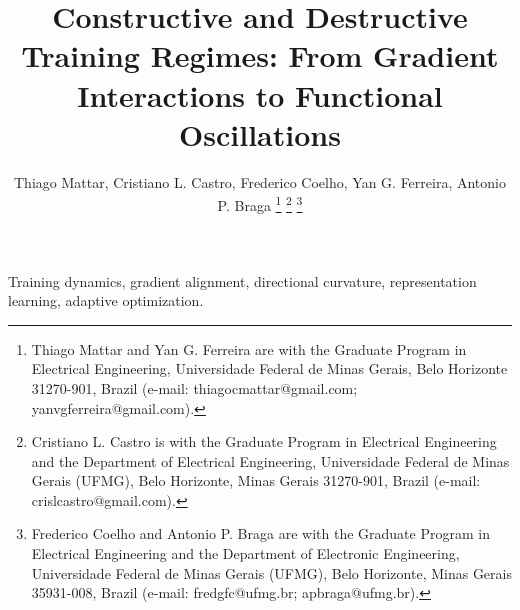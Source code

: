 \documentclass[journal]{IEEEtran}
\title{Constructive and Destructive Training Regimes: From Gradient Interactions to Functional Oscillations}
\author{Thiago Mattar, Cristiano L. Castro, Frederico Coelho, Yan G. Ferreira, Antonio P. Braga%
\thanks{Thiago Mattar and Yan G. Ferreira are with the Graduate Program in Electrical Engineering, Universidade Federal de Minas Gerais, Belo Horizonte 31270-901, Brazil (e-mail: thiagocmattar@gmail.com; yanvgferreira@gmail.com).}%
\thanks{Cristiano L. Castro is with the Graduate Program in Electrical Engineering and the Department of Electrical Engineering, Universidade Federal de Minas Gerais (UFMG), Belo Horizonte, Minas Gerais 31270-901, Brazil (e-mail: crislcastro@gmail.com).}%
\thanks{Frederico Coelho and Antonio P. Braga are with the Graduate Program in Electrical Engineering and the Department of Electronic Engineering, Universidade Federal de Minas Gerais (UFMG), Belo Horizonte, Minas Gerais 35931-008, Brazil (e-mail: fredgfc@ufmg.br; apbraga@ufmg.br).}}
\begin{document}
\maketitle

\begin{IEEEkeywords}
Training dynamics, gradient alignment, directional curvature, representation learning, adaptive optimization.
\end{IEEEkeywords}
\raggedbottom










\end{document}
